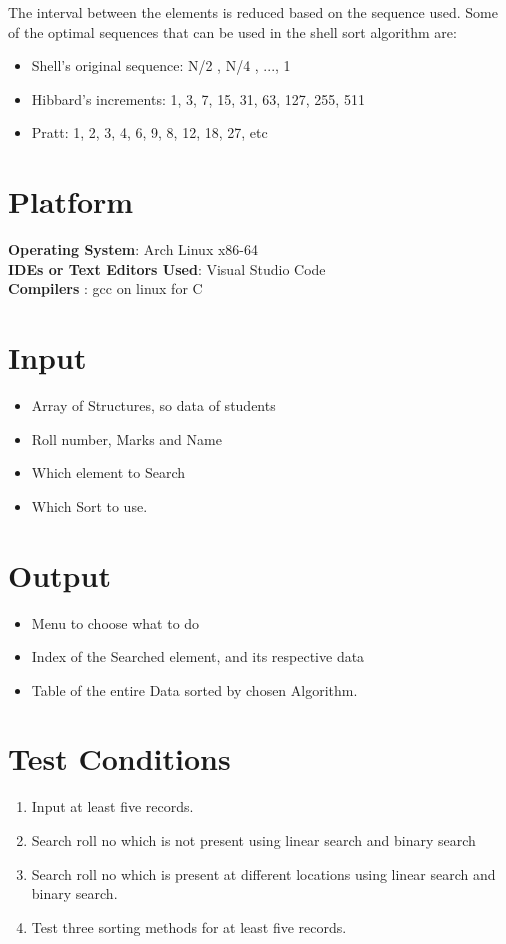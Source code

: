 \documentclass[11pt]{article}
\begin{document}
The interval between the elements is reduced based on the sequence used. Some of the optimal sequences that can be used in the shell sort algorithm are:
\begin{itemize}
	\item Shell's original sequence: N/2 , N/4 , ..., 1
	\item Hibbard's increments: 1, 3, 7, 15, 31, 63, 127, 255, 511
	\item Pratt: 1, 2, 3, 4, 6, 9, 8, 12, 18, 27, etc
\end{itemize}
\section{Platform}
\textbf{Operating System}: Arch Linux x86-64 \\
\textbf{IDEs or Text Editors Used}: Visual Studio Code\\
\textbf{Compilers} : gcc on linux for C\\

\section{Input}

\begin{itemize}
	\item Array of Structures, so data of students
	\item Roll number, Marks and Name
	\item Which element to Search
	\item Which Sort to use.
\end{itemize}

\section{Output}
\begin{itemize}
	\item Menu to choose what to do
	\item Index of the Searched element, and its respective data
	\item Table of the entire Data sorted by chosen Algorithm.
\end{itemize}

\section{Test Conditions}
\begin{enumerate}
	\item Input at least five records.
	\item Search roll no which is not present using linear search and binary search
	\item Search roll no which is present at different locations using linear search and binary search.
	\item Test three sorting methods for at least five records.
\end{enumerate}
\end{document}
